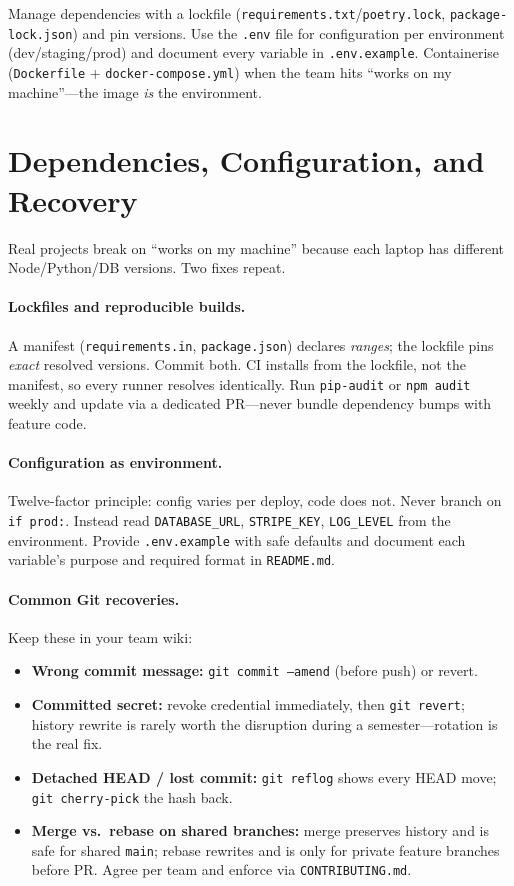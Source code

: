 Manage dependencies with a lockfile
(\texttt{requirements.txt}/\texttt{poetry.lock},
\texttt{package-lock.json}) and pin versions. Use the
\texttt{.env} file for configuration per environment
(dev/staging/prod) and document every variable in
\texttt{.env.example}. Containerise
(\texttt{Dockerfile} + \texttt{docker-compose.yml})
when the team hits ``works on my machine''---the image
\emph{is} the environment.

\section{Dependencies, Configuration, and Recovery}
\label{sec:deps-recovery}

Real projects break on ``works on my machine'' because each laptop has different Node/Python/DB versions. Two fixes repeat.

\paragraph{Lockfiles and reproducible builds.} A manifest (\texttt{requirements.in}, \texttt{package.json}) declares \emph{ranges}; the lockfile pins \emph{exact} resolved versions. Commit both. CI installs from the lockfile, not the manifest, so every runner resolves identically. Run \texttt{pip-audit} or \texttt{npm audit} weekly and update via a dedicated PR---never bundle dependency bumps with feature code.

\paragraph{Configuration as environment.} Twelve-factor principle: config varies per deploy, code does not. Never branch on \texttt{if prod:}. Instead read \texttt{DATABASE\_URL}, \texttt{STRIPE\_KEY}, \texttt{LOG\_LEVEL} from the environment. Provide \texttt{.env.example} with safe defaults and document each variable's purpose and required format in \texttt{README.md}.

\paragraph{Common Git recoveries.} Keep these in your team wiki:
\begin{itemize}
    \item \textbf{Wrong commit message:} \texttt{git commit --amend} (before push) or revert.
    \item \textbf{Committed secret:} revoke credential immediately, then \texttt{git revert}; history rewrite is rarely worth the disruption during a semester---rotation is the real fix.
    \item \textbf{Detached HEAD / lost commit:} \texttt{git reflog} shows every HEAD move; \texttt{git cherry-pick} the hash back.
    \item {\sloppy \textbf{Merge vs.\ rebase on shared branches:} merge preserves history and is safe for shared \texttt{main}; rebase rewrites and is only for private feature branches before PR. Agree per team and enforce via \texttt{CONTRIBUTING.md}.\par}
\end{itemize}

